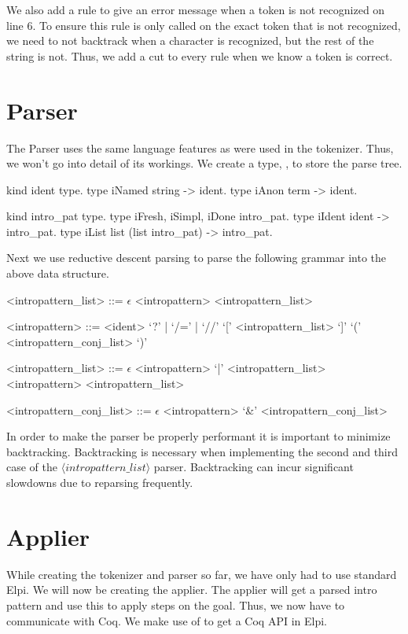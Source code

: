 \documentclass[thesis.tex]{subfiles}
\begin{document}
{{We also add a rule to give an error message when a token is not recognized on line 6. To ensure this rule is only called on the exact token that is not recognized, we need to not backtrack when a character is recognized, but the rest of the string is not. Thus, we add a cut to every rule when we know a token is correct.

\section{Parser}\label{ssec:parser}
The Parser uses the same language features as were used in the tokenizer. Thus, we won't go into detail of its workings. We create a type, , to store the parse tree.
\begin{elpicode}
  kind ident type.
  type iNamed string -> ident.
  type iAnon term -> ident.

  kind intro_pat type.
  type iFresh, iSimpl, iDone intro_pat.
  type iIdent ident -> intro_pat.
  type iList list (list intro_pat) -> intro_pat.
\end{elpicode}
Next we use reductive descent parsing to parse the following grammar into the above data structure.
\begin{grammar}
    <intropattern\_list> ::= $\epsilon$
    \alt <intropattern> <intropattern\_list>

    <intropattern> ::= <ident>
    \alt `?' | `/=' | `//'
    \alt `[' <intropattern\_list> `]'
    \alt `(' <intropattern\_conj\_list> `)'

    <intropattern\_list> ::= $\epsilon$
    \alt <intropattern> `|' <intropattern\_list>
    \alt <intropattern> <intropattern\_list>

    <intropattern\_conj\_list> ::= $\epsilon$
    \alt <intropattern> `&' <intropattern\_conj\_list>
\end{grammar}
In order to make the parser be properly performant it is important to minimize backtracking. Backtracking is necessary when implementing the second and third case of the $\langle intropattern\_list\rangle$ parser. Backtracking can incur significant slowdowns due to reparsing frequently.

\section{Applier}\label{ssec:applier}
While creating the tokenizer and parser so far, we have only had to use standard Elpi. We will now be creating the applier. The applier will get a parsed intro pattern and use this to apply steps on the goal. Thus, we now have to communicate with Coq. We make use of \ce \cite{tassiElpiExtensionLanguage2018} to get a Coq API in Elpi.

}}
\end{document}
